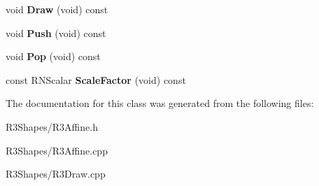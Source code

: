 \begin{DoxyCompactItemize}
\item 
void {\bfseries Draw} (void) const \hypertarget{class_r3_affine_a83f7af6992923f8518b214c3774b7d6f}{}\label{class_r3_affine_a83f7af6992923f8518b214c3774b7d6f}

\item 
void {\bfseries Push} (void) const \hypertarget{class_r3_affine_aa17fc5d5de933300cb19471f1eab1bda}{}\label{class_r3_affine_aa17fc5d5de933300cb19471f1eab1bda}

\item 
void {\bfseries Pop} (void) const \hypertarget{class_r3_affine_aed44fc443e57a44ea4d2987bf7201568}{}\label{class_r3_affine_aed44fc443e57a44ea4d2987bf7201568}

\item 
const R\+N\+Scalar {\bfseries Scale\+Factor} (void) const \hypertarget{class_r3_affine_ae72ccba974f375b6abf72c16accbe105}{}\label{class_r3_affine_ae72ccba974f375b6abf72c16accbe105}

\end{DoxyCompactItemize}


The documentation for this class was generated from the following files\+:\begin{DoxyCompactItemize}
\item 
R3\+Shapes/R3\+Affine.\+h\item 
R3\+Shapes/R3\+Affine.\+cpp\item 
R3\+Shapes/R3\+Draw.\+cpp\end{DoxyCompactItemize}

